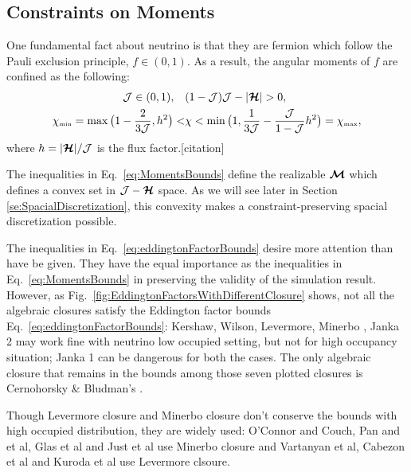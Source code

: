 \subsection{Constraints on Moments}
One fundamental fact about neutrino is that they are fermion which follow the Pauli exclusion principle, $f \in (0,1)$.
As a result, the angular moments of $f$ are confined as the following: 
\begin{align}
\mathcal{J} \in(0,1), \quad &(1-\mathcal{J})\mathcal{J}-|\boldsymbol{\mathcal{H}}|  > 0, \label{eq:MomentsBounds}\\
  \chi_{\mbox{\tiny min}}
  =\max\big(1-\frac{2}{3\mathcal{J}},h^{2}\big)
  < & \chi<\min\big(1,\frac{1}{3\mathcal{J}}-\frac{\mathcal{J}}{1-\mathcal{J}}h^{2}\big)=\chi_{\mbox{\tiny max}},
  \label{eq:eddingtonFactorBounds}
\end{align}
where $h = |\boldsymbol{\mathcal{H}}|/\mathcal{J}$ is the flux factor.[citation]

The inequalities in Eq.~\eqref{eq:MomentsBounds} define the realizable $\boldsymbol{\mathcal{M}}$ which defines a convex set in $\mathcal{J} -\boldsymbol{\mathcal{H}}$ space.
As we will see later in Section \ref{se:SpacialDiscretization}, this convexity makes a constraint-preserving spacial discretization possible.

The inequalities in Eq.~\eqref{eq:eddingtonFactorBounds} desire more attention than have be given.
They have the equal importance as the inequalities in Eq.~\eqref{eq:MomentsBounds} in preserving the validity of the simulation result.
However, as Fig.~\eqref{fig:EddingtonFactorsWithDifferentClosure} shows, not all the algebraic closures satisfy the Eddington factor bounds Eq.~\eqref{eq:eddingtonFactorBounds}: Kershaw\cite{kershaw_1976}, Wilson\cite{wilson_1975,leblancWilson_1970}, Levermore\cite{levermore_1984}, Minerbo \cite{minerbo_1978}, Janka 2\cite{janka_1992} may work fine with neutrino low occupied setting, but not for high occupancy situation; Janka 1\cite{janka_1991} can be dangerous for both the cases.
The only algebraic closure that remains in the bounds among those seven plotted closures is Cernohorsky \& Bludman's \cite{cernohorskyBludman_1994}.

Though Levermore closure and Minerbo closure don't conserve the bounds with high occupied distribution, they are widely used: {O'Connor} and {Couch}\cite{oConnorCouch_2018}, Pan and et al\cite{pan_etal_2018}, Glas et al\cite{glas_etal_2018} and Just et al\cite{just_etal_2018} use Minerbo closure and Vartanyan et al\cite{vartanyan_etal_2018}, Cabezon et al\cite{cabezon_etal_2018} and Kuroda et al\cite{kuroda_etal_2016} use Levermore clsoure.

